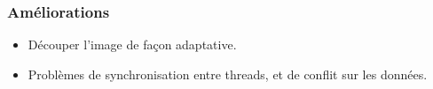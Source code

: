 \begin{frame}
\frametitle{Améliorations}

\begin{itemize}
\item Découper l'image de façon adaptative.
\item Problèmes de synchronisation entre threads, et de conflit sur les données.
\end{itemize}
\end{frame}
